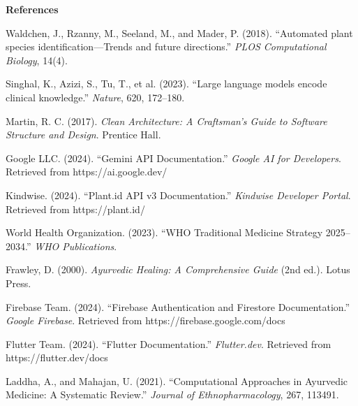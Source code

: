 \documentclass[12pt]{article}
\begin{document}
\begin{center}
  {\Large \textbf{References}}
\end{center}

\vspace{0.5cm}

\begin{enumerate}[leftmargin=*, label={[\arabic*]}]

    \item Waldchen, J., Rzanny, M., Seeland, M., and Mader, P. (2018). ``Automated plant species
    identification---Trends and future directions.'' \textit{PLOS Computational Biology}, 14(4).

    \item Singhal, K., Azizi, S., Tu, T., et al. (2023). ``Large language models encode clinical
    knowledge.'' \textit{Nature}, 620, 172--180.

    \item Martin, R. C. (2017). \textit{Clean Architecture: A Craftsman's Guide to Software
    Structure and Design}. Prentice Hall.

    \item Google LLC. (2024). ``Gemini API Documentation.'' \textit{Google AI for Developers}.
    Retrieved from https://ai.google.dev/

    \item Kindwise. (2024). ``Plant.id API v3 Documentation.'' \textit{Kindwise Developer Portal}.
    Retrieved from https://plant.id/

    \item World Health Organization. (2023). ``WHO Traditional Medicine Strategy 2025--2034.''
    \textit{WHO Publications}.

    \item Frawley, D. (2000). \textit{Ayurvedic Healing: A Comprehensive Guide} (2nd ed.).
    Lotus Press.

    \item Firebase Team. (2024). ``Firebase Authentication and Firestore Documentation.''
    \textit{Google Firebase}. Retrieved from https://firebase.google.com/docs

    \item Flutter Team. (2024). ``Flutter Documentation.'' \textit{Flutter.dev}.
    Retrieved from https://flutter.dev/docs

    \item Laddha, A., and Mahajan, U. (2021). ``Computational Approaches in Ayurvedic Medicine:
    A Systematic Review.'' \textit{Journal of Ethnopharmacology}, 267, 113491.


\end{enumerate}
\end{document}
